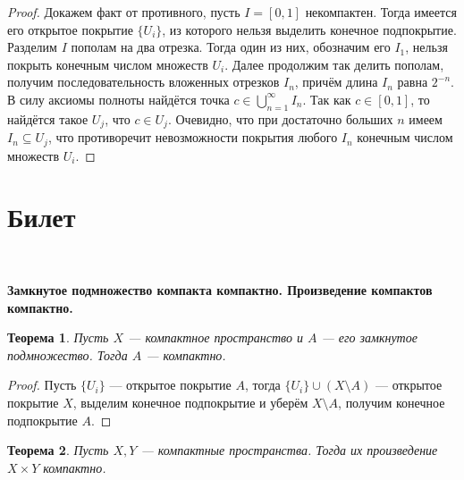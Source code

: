 \documentclass[a4paper,100pt]{article}
\theoremstyle{indented}
\newtheorem{theorem}{Теорема}
\begin{document}
\begin{proof}
    Докажем факт от противного, пусть $I=[0,1]$ некомпактен. Тогда имеется его открытое покрытие $\{U_i\}$, из которого нельзя выделить конечное подпокрытие.\\

    Разделим $I$ пополам на два отрезка. Тогда один из них, обозначим его $I_1$, нельзя покрыть конечным числом множеств $U_i$. Далее продолжим так делить пополам, получим последовательность вложенных отрезков $I_n$, причём длина $I_n$ равна $2^{-n}$.\\

    В силу аксиомы полноты найдётся точка $c\in\bigcup_{n=1}^{\infty} I_n$. Так как $c\in[0,1]$, то найдётся такое $U_j$, что $c\in U_j$. Очевидно, что при достаточно больших $n$ имеем $I_n\subseteq U_j$, что противоречит невозможности покрытия любого $I_n$ конечным числом множеств $U_i$.
\end{proof}


\section{Билет} \

\medskip

\textbf{Замкнутое подмножество компакта компактно. Произведение компактов компактно.}\\
    
    \begin{theorem}
        Пусть $X$ --- компактное пространство и $A$ --- его замкнутое подмножество. Тогда $A$ --- компактно.
    \end{theorem}
    
    \begin{proof}
        Пусть $\{U_i\}$ --- открытое покрытие $A$, тогда $\{U_i\} \cup (X \setminus A)$ --- открытое покрытие $X$, выделим конечное подпокрытие и уберём $X\setminus A$, получим конечное подпокрытие $A$.
    \end{proof}
    
    \begin{theorem}
        Пусть $X, Y$ --- компактные пространства. Тогда их произведение $X \times Y$ компактно.
    \end{theorem}
    
\end{document}
